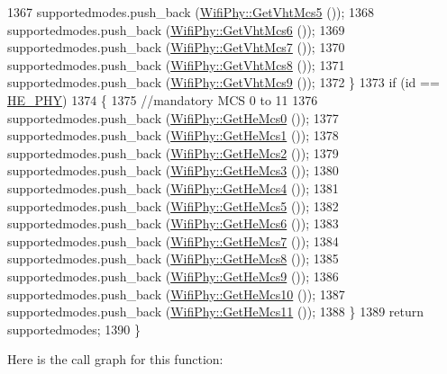 \begin{DoxyCode}
1367       supportedmodes.push\_back (\hyperlink{classns3_1_1WifiPhy_a214c87eb5f05eb2d07b2d1cccf77311a}{WifiPhy::GetVhtMcs5} ());
1368       supportedmodes.push\_back (\hyperlink{classns3_1_1WifiPhy_acd4b16742a9bfc62664da3b415ce2a42}{WifiPhy::GetVhtMcs6} ());
1369       supportedmodes.push\_back (\hyperlink{classns3_1_1WifiPhy_a70fad3da915d04f22a068a5ffb5f995c}{WifiPhy::GetVhtMcs7} ());
1370       supportedmodes.push\_back (\hyperlink{classns3_1_1WifiPhy_a4acd4de849ca0a208e2d8e021f6a0173}{WifiPhy::GetVhtMcs8} ());
1371       supportedmodes.push\_back (\hyperlink{classns3_1_1WifiPhy_aa435b5512868852aa272d9b963e581a0}{WifiPhy::GetVhtMcs9} ());
1372     \}
1373   \textcolor{keywordflow}{if} (\textcolor{keywordtype}{id} == \hyperlink{wifi-phy_8h_a4d8ba0c6033ee667a5145799b36facec}{HE\_PHY})
1374     \{
1375       \textcolor{comment}{//mandatory MCS 0 to 11}
1376       supportedmodes.push\_back (\hyperlink{classns3_1_1WifiPhy_a63b9a66fa49db202c506805e92bad63c}{WifiPhy::GetHeMcs0} ());
1377       supportedmodes.push\_back (\hyperlink{classns3_1_1WifiPhy_abba9c5cbc94f1f95a0182a383c0f9a1a}{WifiPhy::GetHeMcs1} ());
1378       supportedmodes.push\_back (\hyperlink{classns3_1_1WifiPhy_a6c92d5a60cf608d311b043c191261803}{WifiPhy::GetHeMcs2} ());
1379       supportedmodes.push\_back (\hyperlink{classns3_1_1WifiPhy_a8dadb22ce1e9f081a602dcc41b606e95}{WifiPhy::GetHeMcs3} ());
1380       supportedmodes.push\_back (\hyperlink{classns3_1_1WifiPhy_a80c8ac4faa7043b42b883ccacc1c3eec}{WifiPhy::GetHeMcs4} ());
1381       supportedmodes.push\_back (\hyperlink{classns3_1_1WifiPhy_a351b1aaf23c3854c453e6f4c5232857a}{WifiPhy::GetHeMcs5} ());
1382       supportedmodes.push\_back (\hyperlink{classns3_1_1WifiPhy_a90aedf7f42b6e3d02b5621e4dcad8adf}{WifiPhy::GetHeMcs6} ());
1383       supportedmodes.push\_back (\hyperlink{classns3_1_1WifiPhy_a6fb0a12105608fd43c813f914e621b49}{WifiPhy::GetHeMcs7} ());
1384       supportedmodes.push\_back (\hyperlink{classns3_1_1WifiPhy_ad90ca59ec933cc5d31381f2a198db6d0}{WifiPhy::GetHeMcs8} ());
1385       supportedmodes.push\_back (\hyperlink{classns3_1_1WifiPhy_a4d94bd283f2b034595fb1add2d57339c}{WifiPhy::GetHeMcs9} ());
1386       supportedmodes.push\_back (\hyperlink{classns3_1_1WifiPhy_aebd346d53abef108a427b6fdc8b7e76b}{WifiPhy::GetHeMcs10} ());
1387       supportedmodes.push\_back (\hyperlink{classns3_1_1WifiPhy_abd100bfd5ef335f48b294cd5ea3b67a4}{WifiPhy::GetHeMcs11} ());
1388     \}
1389   \textcolor{keywordflow}{return} supportedmodes;
1390 \}
\end{DoxyCode}


Here is the call graph for this function\+:


